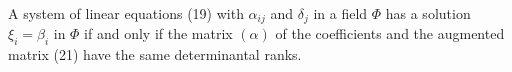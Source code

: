 A system of linear equations (19) with $\alpha_{ij}$ and $\delta_j$ in a field $\Phi$ has a solution $\xi_i = \beta_i$ in $\Phi$ if and only if the matrix $(\alpha)$ of the coefficients and the augmented matrix (21) have the same determinantal ranks.
